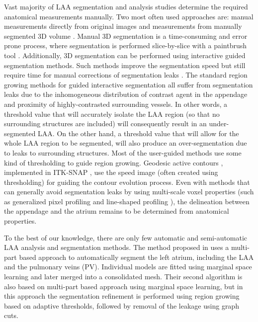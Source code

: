 \documentclass[review]{elsarticle}
\begin{document}
Vast majority of LAA segmentation and analysis studies determine the required
anatomical measurements manually.  Two most often used approaches are: manual
measurements directly from original images
\cite{saw2016_ComparingMeasurementsCT} and measurements from manually segmented
3D volume
\cite{song2016_MorphologicAssessmentLeft,otton2015_LeftAtrialAppendage}.
Manual 3D segmentation is a time-consuming and error prone process, where
segmentation is performed slice-by-slice with a paintbrush tool
\cite{otton2015_LeftAtrialAppendage}. Additionally, 3D segmentation can be
performed using interactive guided segmentation methods. Such methods improve
the segmentation speed but still require time for manual corrections of
segmentation leaks \cite{song2016_MorphologicAssessmentLeft}.  The standard
region growing methods for guided interactive segmentation all suffer from
segmentation leaks due to the inhomogeneous distribution of contrast agent in
the appendage and proximity of highly-contrasted surrounding vessels. In other
words, a threshold value that will accurately isolate the LAA region (so that
no surrounding structures are included) will consequently result in an
under-segmented LAA. On the other hand, a threshold value that will allow for
the whole LAA region to be segmented, will also produce an over-segmentation
due to leaks to surrounding structures.  Most of the user-guided methods use
some kind of thresholding to guide region growing.  Geodesic active contours
\cite{caselles1997_Geodesicactivecontours}, implemented in ITK-SNAP
\cite{yushkevich2006_Userguided3Dactive}, use the speed image (often created
using thresholding) for guiding the contour evolution process.  Even with
methods that can generally avoid segmentation leaks by using multi-scale voxel
properties (such as generalized pixel profiling
\cite{babin2012_Generalizedpixelprofiling} and line-shaped profiling
\cite{babin2013_Brainbloodvessel}), the delineation between the appendage and the atrium
remains to be determined from anatomical properties. 




To the best of our knowledge, there are only few automatic and 
semi-automatic LAA analysis and segmentation methods.
The method proposed in \cite{zheng2008_FourChamberHeartModeling} uses 
a multi-part based approach to automatically segment the left atrium, including the 
LAA and the pulmonary veins (PV). Individual models are fitted using marginal space learning 
and later merged into a consolidated mesh. Their second algorithm 
\cite{zheng2014_Multipartmodelingsegmentation} is also based on multi-part based approach
using marginal space learning, but in this approach the segmentation refinement is 
performed using region growing based on adaptive thresholds, followed by 
removal of the leakage using graph cuts. 
\end{document}

